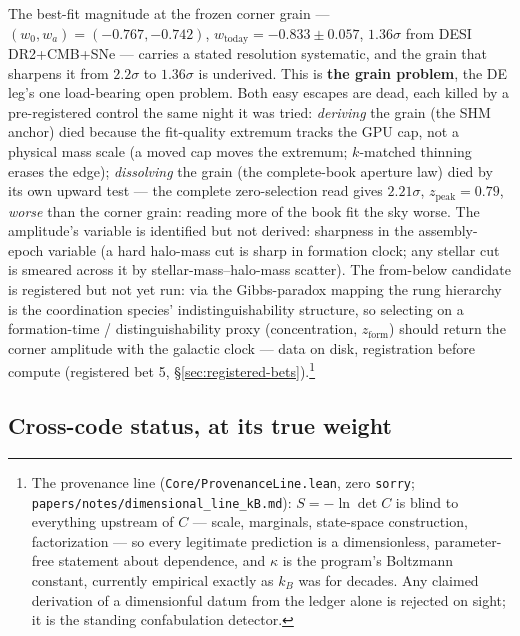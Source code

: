 \documentclass[11pt,a4paper]{article}
\begin{document}
The best-fit magnitude at the frozen corner grain --- $(w_0, w_a) = (-0.767, -0.742)$, $w_{\text{today}} = -0.833 \pm 0.057$, $1.36\sigma$ from DESI DR2+CMB+SNe --- carries a stated resolution systematic, and the grain that sharpens it from $2.2\sigma$ to $1.36\sigma$ is underived. This is \textbf{the grain problem}, the DE leg's one load-bearing open problem. Both easy escapes are dead, each killed by a pre-registered control the same night it was tried: \emph{deriving} the grain (the SHM anchor) died because the fit-quality extremum tracks the GPU cap, not a physical mass scale (a moved cap moves the extremum; $k$-matched thinning erases the edge); \emph{dissolving} the grain (the complete-book aperture law) died by its own upward test --- the complete zero-selection read gives $2.21\sigma$, $z_{\text{peak}} = 0.79$, \emph{worse} than the corner grain: reading more of the book fit the sky worse. The amplitude's variable is identified but not derived: sharpness in the assembly-epoch variable (a hard halo-mass cut is sharp in formation clock; any stellar cut is smeared across it by stellar-mass--halo-mass scatter). The from-below candidate is registered but not yet run: via the Gibbs-paradox mapping the rung hierarchy is the coordination species' indistinguishability structure, so selecting on a formation-time / distinguishability proxy (concentration, $z_{\text{form}}$) should return the corner amplitude with the galactic clock --- data on disk, registration before compute (registered bet 5, \S\ref{sec:registered-bets}).\footnote{The provenance line (\texttt{Core/ProvenanceLine.lean}, zero \texttt{sorry}; \texttt{papers/notes/dimensional\_line\_kB.md}): $S = -\ln\det C$ is blind to everything upstream of $C$ --- scale, marginals, state-space construction, factorization --- so every legitimate prediction is a dimensionless, parameter-free statement about dependence, and $\kappa$ is the program's Boltzmann constant, currently empirical exactly as $k_B$ was for decades. Any claimed derivation of a dimensionful datum from the ledger alone is rejected on sight; it is the standing confabulation detector.}

\subsection*{Cross-code status, at its true weight}
\end{document}
